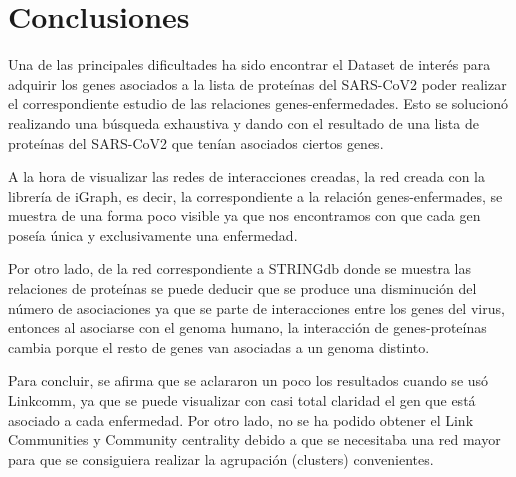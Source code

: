 \section{Conclusiones}

Una de las principales dificultades ha sido encontrar el Dataset de interés para adquirir los genes asociados a la lista de proteínas del SARS-CoV2 poder realizar el correspondiente estudio de las relaciones genes-enfermedades. Esto se solucionó realizando una búsqueda exhaustiva y dando con el resultado de una lista de proteínas del SARS-CoV2 que tenían asociados ciertos genes. 

\newline

A la hora de visualizar las redes de interacciones creadas, la red creada con la librería de iGraph, es decir, la correspondiente a la relación genes-enfermades, se muestra de una forma poco visible ya que nos encontramos con que cada gen poseía única y exclusivamente una enfermedad. 

\newline

Por otro lado, de la red correspondiente a STRINGdb donde se muestra las relaciones de proteínas se puede deducir que se produce una disminución del número de asociaciones ya que se parte de interacciones entre los genes del virus, entonces al asociarse con el genoma humano, la interacción de genes-proteínas cambia porque el resto de genes van asociadas a un genoma distinto. 

\newline

Para concluir, se afirma que se aclararon un poco los resultados cuando se usó Linkcomm, ya que se puede visualizar con casi total claridad el gen que está asociado a cada enfermedad. Por otro lado, no se ha podido obtener el Link Communities y Community centrality debido a que se necesitaba una red mayor para que se consiguiera realizar la agrupación (clusters) convenientes. 

 

 
